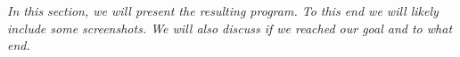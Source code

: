 \textit{In this section, we will present the resulting program. To this end we will likely include some screenshots. We will also discuss if we reached our goal and to what end.}